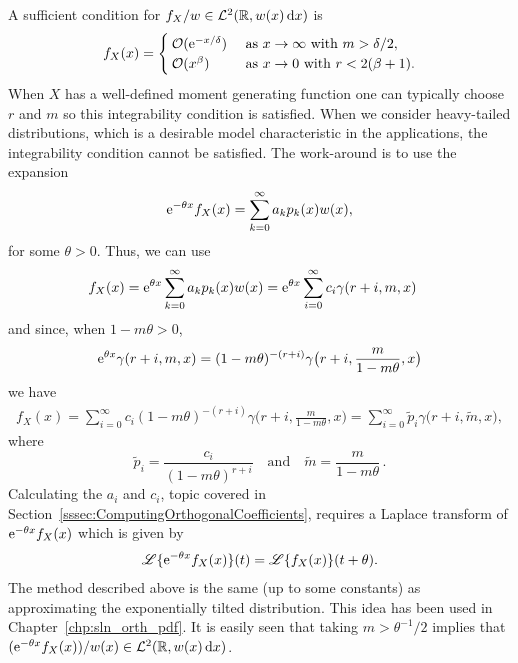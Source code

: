 A sufficient condition for $f_{X}/w\in\mathcal{L}^2(\mathbb{R}, w(x) \mathop{}\!\mathrm{d} x)$ is
\begin{equation} \label{eq:IntegrabilityCondition}
f_{X}(x)=
\begin{cases}
{\mathcal{O}}(\mathrm{e}^{- x/\delta})&\text{ as }x\rightarrow\infty\text{ with }m>\delta/2,\\
{\mathcal{O}}(x^{\beta})&\text{  as }x\rightarrow0\text{ with } r < 2( \beta + 1).
\end{cases}
\end{equation}
When $X$ has a well-defined moment generating function one can typically choose $r$ and $m$ so this integrability condition is satisfied. When we consider heavy-tailed distributions, which is a desirable model characteristic in the applications, the integrability condition cannot be satisfied. The work-around is to use the expansion
\[ \mathrm{e}^{-\theta x} f_{X}(x)
= \sum_{k=0}^\infty a_k p_k(x) w(x),  \]
for some $\theta > 0$. Thus, we can use
\begin{align*}
f_{X}(x)
&= \mathrm{e}^{\theta x} \sum_{k=0}^\infty a_k p_k(x) w(x)
=  \mathrm{e}^{\theta x} \sum_{i=0}^{\infty} c_i \gamma(r+i,m,x)
\end{align*}
and since, when $1-m \theta > 0$,
\[ \mathrm{e}^{\theta x} \gamma(r+i, m, x) = (1-m \theta)^{-(r+i)} \gamma\big(r+i, \frac{m}{1-m\theta}, x \big)  \]
we have
\begin{align*}
f_{X}(x)
= \sum_{i=0}^{\infty} c_i (1-m \theta)^{-(r+i)} \gamma\big(r+i, \frac{m}{1-m\theta}, x \big)
= \sum_{i=0}^{\infty} \widetilde{p}_i \gamma\big(r+i, \widetilde{m}, x \big),
\end{align*}
where
\[ \widetilde{p}_i = \frac{ c_i }{(1-m \theta)^{r+i}}
\quad\text{and}\quad
\widetilde{m} = \frac{m}{1-m\theta} \,.
\]
Calculating the $a_i$ and $c_i$, topic covered in Section~\ref{sssec:ComputingOrthogonalCoefficients}, requires a Laplace transform of $\mathrm{e}^{-\theta x} f_{X}(x)$ which is given by
\begin{align*}
\mathscr{L}\{ \mathrm{e}^{-\theta x} f_{X}(x) \}(t)
= \mathscr{L}\{ f_{X}(x) \}(t+\theta).
\end{align*}
The method described above is the same (up to some constants) as approximating the exponentially tilted distribution.
This idea has been used in Chapter~\ref{chp:sln_orth_pdf}.
It is easily seen that taking $m >\theta^{-1}/2$ implies that $(\mathrm{e}^{-\theta x} f_{X}(x))/w(x)\in\mathcal{L}^2(\mathbb{R}, w(x) \mathop{}\!\mathrm{d} x)$.

